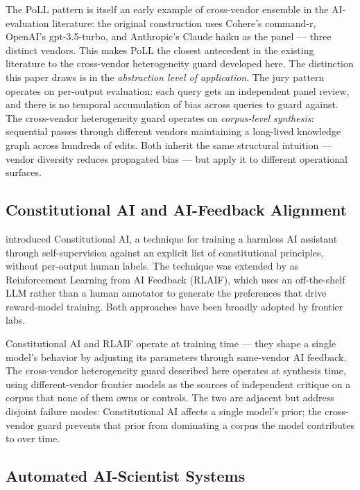 The PoLL pattern is itself an early example of cross-vendor ensemble in the AI-evaluation literature: the original \citet{verga2024replacing} construction uses Cohere's command-r, OpenAI's gpt-3.5-turbo, and Anthropic's Claude haiku as the panel --- three distinct vendors. This makes PoLL the closest antecedent in the existing literature to the cross-vendor heterogeneity guard developed here. The distinction this paper draws is in the \emph{abstraction level of application}. The jury pattern operates on per-output evaluation: each query gets an independent panel review, and there is no temporal accumulation of bias across queries to guard against. The cross-vendor heterogeneity guard operates on \emph{corpus-level synthesis}: sequential passes through different vendors maintaining a long-lived knowledge graph across hundreds of edits. Both inherit the same structural intuition --- vendor diversity reduces propagated bias --- but apply it to different operational surfaces.

\subsection{Constitutional AI and AI-Feedback Alignment}

\citet{bai2022constitutional} introduced Constitutional AI, a technique for training a harmless AI assistant through self-supervision against an explicit list of constitutional principles, without per-output human labels. The technique was extended by \citet{lee2023rlaif} as Reinforcement Learning from AI Feedback (RLAIF), which uses an off-the-shelf LLM rather than a human annotator to generate the preferences that drive reward-model training. Both approaches have been broadly adopted by frontier labs.

Constitutional AI and RLAIF operate at training time --- they shape a single model's behavior by adjusting its parameters through same-vendor AI feedback. The cross-vendor heterogeneity guard described here operates at synthesis time, using different-vendor frontier models as the sources of independent critique on a corpus that none of them owns or controls. The two are adjacent but address disjoint failure modes: Constitutional AI affects a single model's prior; the cross-vendor guard prevents that prior from dominating a corpus the model contributes to over time.

\subsection{Automated AI-Scientist Systems}

